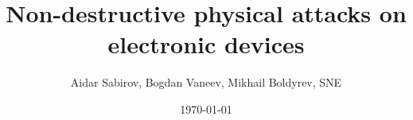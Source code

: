 \documentclass[a4paper]{article}
\begin{document}
\title{Non-destructive physical attacks on electronic devices}
\author{Aidar Sabirov, Bogdan Vaneev, Mikhail Boldyrev, SNE}
\date{\today}

\maketitle
\tableofcontents
\listoffigures
\newpage




\newpage


\end{document}
